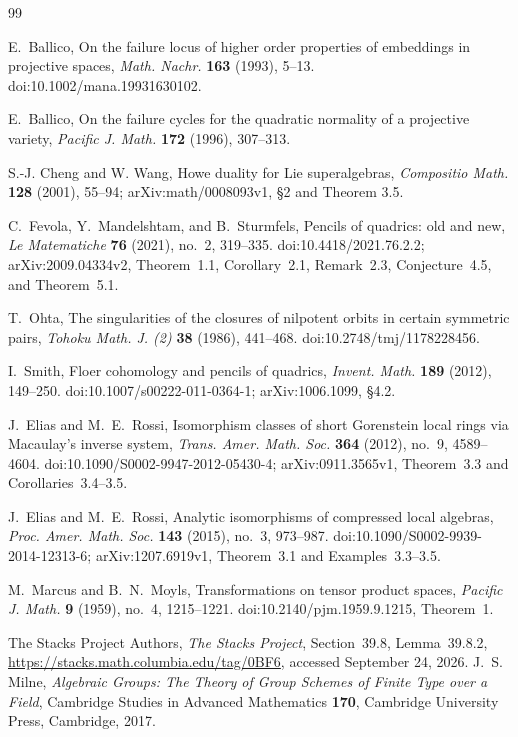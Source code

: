 \documentclass[11pt,reqno]{amsart}
\numberwithin{equation}{section}
\theoremstyle{definition}\newtheorem{definition}[theorem]{Definition}
\theoremstyle{remark}\newtheorem{remark}[theorem]{Remark}
\begin{document}
\begin{thebibliography}{99}

E.~Ballico,
On the failure locus of higher order properties of embeddings in
projective spaces,
\emph{Math. Nachr.} \textbf{163} (1993), 5--13.
doi:10.1002/mana.19931630102.

E.~Ballico,
On the failure cycles for the quadratic normality of a projective
variety,
\emph{Pacific J. Math.} \textbf{172} (1996), 307--313.

S.-J. Cheng and W. Wang, Howe duality for Lie superalgebras,
\emph{Compositio Math.} \textbf{128} (2001), 55--94;
arXiv:math/0008093v1, \S2 and Theorem 3.5.

C.~Fevola, Y.~Mandelshtam, and B.~Sturmfels,
Pencils of quadrics: old and new,
\emph{Le Matematiche} \textbf{76} (2021), no.~2, 319--335.
doi:10.4418/2021.76.2.2; arXiv:2009.04334v2,
Theorem~1.1, Corollary~2.1, Remark~2.3, Conjecture~4.5, and Theorem~5.1.

T.~Ohta, The singularities of the closures of nilpotent orbits in certain
symmetric pairs, \emph{Tohoku Math. J. (2)} \textbf{38} (1986), 441--468.
doi:10.2748/tmj/1178228456.

I.~Smith, Floer cohomology and pencils of quadrics,
\emph{Invent. Math.} \textbf{189} (2012), 149--250.
doi:10.1007/s00222-011-0364-1; arXiv:1006.1099, \S4.2.

J.~Elias and M.~E.~Rossi,
Isomorphism classes of short Gorenstein local rings via Macaulay's
inverse system,
\emph{Trans. Amer. Math. Soc.} \textbf{364} (2012), no.~9, 4589--4604.
doi:10.1090/S0002-9947-2012-05430-4;
arXiv:0911.3565v1, Theorem~3.3 and Corollaries~3.4--3.5.

J.~Elias and M.~E.~Rossi,
Analytic isomorphisms of compressed local algebras,
\emph{Proc. Amer. Math. Soc.} \textbf{143} (2015), no.~3, 973--987.
doi:10.1090/S0002-9939-2014-12313-6;
arXiv:1207.6919v1, Theorem~3.1 and Examples~3.3--3.5.

M.~Marcus and B.~N.~Moyls,
Transformations on tensor product spaces,
\emph{Pacific J. Math.} \textbf{9} (1959), no.~4, 1215--1221.
doi:10.2140/pjm.1959.9.1215, Theorem~1.

The Stacks Project Authors,
\emph{The Stacks Project}, Section~39.8, Lemma~39.8.2,
\url{https://stacks.math.columbia.edu/tag/0BF6}, accessed September 24, 2026.
J.~S. Milne, \emph{Algebraic Groups: The Theory of Group Schemes of
Finite Type over a Field}, Cambridge Studies in Advanced Mathematics
\textbf{170}, Cambridge University Press, Cambridge, 2017.


\end{thebibliography}
\end{document}
